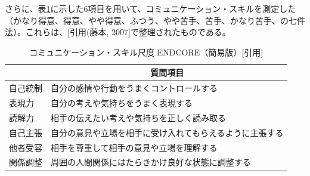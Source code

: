 \documentclass[11pt, a4paper]{jreport} %
\begin{document}
さらに、表\ref{tab:daibo3}に示した6項目を用いて、コミュニケーション・スキルを測定した（かなり得意、得意、やや得意、ふつう、やや苦手、苦手、かなり苦手、の七件法）。これらは、[引用(藤本, 2007]で整理されたものである。
\begin{table}[H]
\caption{コミュニケーション・スキル尺度 ENDCORE（簡易版）[引用]}
\label{tab:daibo3}
\centering
\begin{tabular}{@{}ll@{}}
\toprule
\multicolumn{1}{c}{} & \multicolumn{1}{c}{質問項目}     \\ \midrule
自己統制                 & 自分の感情や行動をうまくコントロールする         \\
表現力                  & 自分の考えや気持ちをうまく表現する            \\
読解力                  & 相手の伝えたい考えや気持ちを正しく読み取る        \\
自己主張                 & 自分の意見や立場を相手に受け入れてもらえるように主張する \\
他者受容                 & 相手を尊重して相手の意見や立場を理解する         \\
関係調整                 & 周囲の人間関係にはたらきかけ良好な状態に調整する     \\ \bottomrule
\end{tabular}
\end{table}

\end{document}
